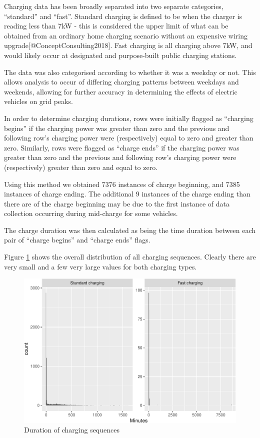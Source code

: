 \documentclass[]{article}
\begin{document}
Charging data has been broadly separated into two separate categories,
``standard'' and ``fast''. Standard charging is defined to be when the
charger is reading less than 7kW - this is considered the upper limit of
what can be obtained from an ordinary home charging scenario without an
expensive wiring upgrade{[}@ConceptConsulting2018{]}. Fast charging is
all charging above 7kW, and would likely occur at designated and
purpose-built public charging stations.

The data was also categorised according to whether it was a weekday or
not. This allows analysis to occur of differing charging patterns
between weekdays and weekends, allowing for further accuracy in
determining the effects of electric vehicles on grid peaks.

In order to determine charging durations, rows were initially flagged as
``charging begins'' if the charging power was greater than zero and the
previous and following row's charging power were (respectively) equal to
zero and greater than zero. Similarly, rows were flagged as ``charge
ends'' if the charging power was greater than zero and the previous and
following row's charging power were (respectively) greater than zero and
equal to zero.

Using this method we obtained 7376 instances of charge beginning, and
7385 instances of charge ending. The additional 9 instances of the
charge ending than there are of the charge beginning may be due to the
first instance of data collection occurring during mid-charge for some
vehicles.

The charge duration was then calculated as being the time duration
between each pair of ``charge begins'' and ``charge ends'' flags.

Figure \ref{fig:durationHist} shows the overall distribution of all
charging sequences. Clearly there are very small and a few very large
values for both charging types.

\begin{figure}
\centering
\includegraphics{EVBB_report_files/figure-latex/durationHist-1.pdf}
\caption{\label{fig:durationHist}Duration of charging sequences}
\end{figure}
\end{document}

